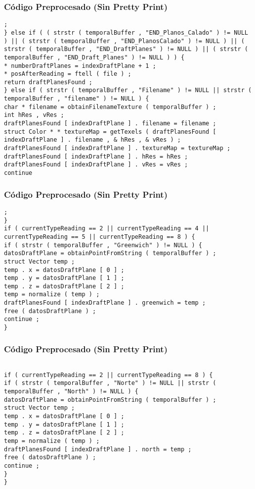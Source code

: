 \documentclass{beamer}
\begin{document}
\begin{frame}[fragile]
\frametitle{C\'odigo Preprocesado (Sin Pretty Print)}
\begin{lstlisting}[style=CStyle]
; 
} else if ( ( strstr ( temporalBuffer , "END_Planos_Calado" ) != NULL ) || ( strstr ( temporalBuffer , "END_PlanosCalado" ) != NULL ) || ( strstr ( temporalBuffer , "END_DraftPlanes" ) != NULL ) || ( strstr ( temporalBuffer , "END_Draft_Planes" ) != NULL ) ) { 
* numberDraftPlanes = indexDraftPlane + 1 ; 
* posAfterReading = ftell ( file ) ; 
return draftPlanesFound ; 
} else if ( strstr ( temporalBuffer , "Filename" ) != NULL || strstr ( temporalBuffer , "filename" ) != NULL ) { 
char * filename = obtainFilenameTexture ( temporalBuffer ) ; 
int hRes , vRes ; 
draftPlanesFound [ indexDraftPlane ] . filename = filename ; 
struct Color * * textureMap = getTexels ( draftPlanesFound [ indexDraftPlane ] . filename , & hRes , & vRes ) ; 
draftPlanesFound [ indexDraftPlane ] . textureMap = textureMap ; 
draftPlanesFound [ indexDraftPlane ] . hRes = hRes ; 
draftPlanesFound [ indexDraftPlane ] . vRes = vRes ; 
continue \end{lstlisting}
\end{frame}
\begin{frame}[fragile]
\frametitle{C\'odigo Preprocesado (Sin Pretty Print)}
\begin{lstlisting}[style=CStyle]
; 
} 
if ( currentTypeReading == 2 || currentTypeReading == 4 || currentTypeReading == 5 || currentTypeReading == 8 ) { 
if ( strstr ( temporalBuffer , "Greenwich" ) != NULL ) { 
datosDraftPlane = obtainPointFromString ( temporalBuffer ) ; 
struct Vector temp ; 
temp . x = datosDraftPlane [ 0 ] ; 
temp . y = datosDraftPlane [ 1 ] ; 
temp . z = datosDraftPlane [ 2 ] ; 
temp = normalize ( temp ) ; 
draftPlanesFound [ indexDraftPlane ] . greenwich = temp ; 
free ( datosDraftPlane ) ; 
continue ; 
} \end{lstlisting}
\end{frame}
\begin{frame}[fragile]
\frametitle{C\'odigo Preprocesado (Sin Pretty Print)}
\begin{lstlisting}[style=CStyle]

if ( currentTypeReading == 2 || currentTypeReading == 8 ) { 
if ( strstr ( temporalBuffer , "Norte" ) != NULL || strstr ( temporalBuffer , "North" ) != NULL ) { 
datosDraftPlane = obtainPointFromString ( temporalBuffer ) ; 
struct Vector temp ; 
temp . x = datosDraftPlane [ 0 ] ; 
temp . y = datosDraftPlane [ 1 ] ; 
temp . z = datosDraftPlane [ 2 ] ; 
temp = normalize ( temp ) ; 
draftPlanesFound [ indexDraftPlane ] . north = temp ; 
free ( datosDraftPlane ) ; 
continue ; 
} 
} \end{lstlisting}
\end{frame}
\end{document}

